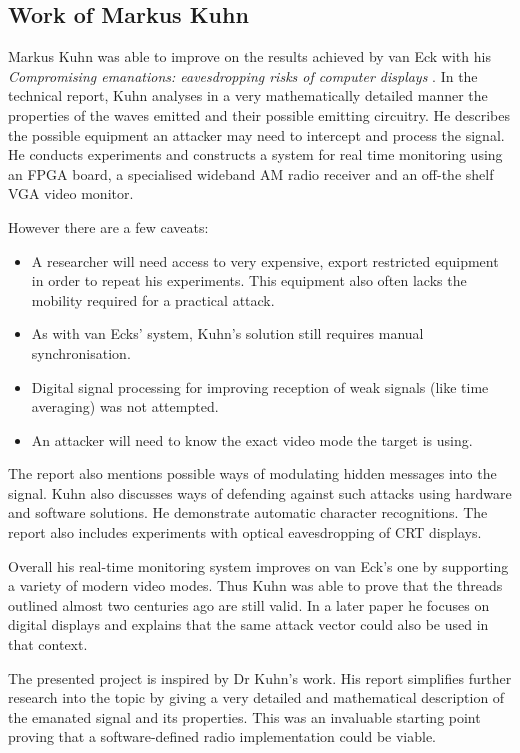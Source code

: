 \documentclass[a4paper,12pt,twoside,openright]{report}
\begin{document}
\subsection{Work of Markus Kuhn}

Markus Kuhn was able to improve on the results achieved by van Eck with his \textit{Compromising emanations: eavesdropping risks of computer displays} \cite{kuhn2003compromising}. In the technical report, Kuhn analyses in a very mathematically detailed manner the properties of the waves emitted and their possible emitting circuitry. He describes the possible equipment an attacker may need to intercept and process the signal. He conducts experiments and constructs a system for real time monitoring using an FPGA board, a specialised wideband AM radio receiver and an off-the shelf VGA video monitor. 

However there are a few caveats:

\begin{itemize}

  \item A researcher will need access to very expensive, export restricted equipment in order to repeat his experiments. This equipment also often lacks the mobility required for a practical attack.
  \item As with van Ecks' system, Kuhn's solution still requires manual synchronisation.
  \item Digital signal processing for improving reception of weak signals (like time averaging) was not attempted.
  \item An attacker will need to know the exact video mode the target is using.

\end{itemize}

The report also mentions possible ways of modulating hidden messages into the signal. Kuhn also discusses ways of defending against such attacks using hardware and software solutions. He demonstrate automatic character recognitions. The report also includes experiments with optical eavesdropping of CRT displays.

Overall his real-time monitoring system improves on van Eck's one by supporting a variety of modern video modes. Thus Kuhn was able to prove that the threads outlined almost two centuries ago are still valid. In a later paper \cite{kuhn2005electromagnetic} he focuses on digital displays and explains that the same attack vector could also be used in that context.

The presented project is inspired by Dr Kuhn's work. His report simplifies further research into the topic by giving a very detailed and mathematical description of the emanated signal and its properties. This was an invaluable starting point proving that a software-defined radio implementation could be viable.
\end{document}
